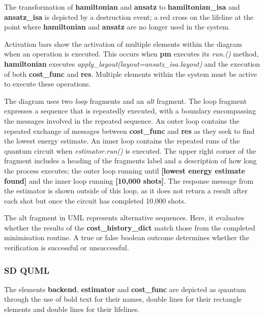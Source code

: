 \documentclass{article}
\begin{document}
The transformation of \textbf{hamiltonian} and \textbf{ansatz} to \textbf{hamiltonian\_isa} and \textbf{ansatz\_isa} is depicted by a destruction event; a red cross on the lifeline at the point where \textbf{hamiltonian} and \textbf{ansatz} are no longer used in the system.

Activation bars show the activation of multiple elements within the diagram when an operation is executed\cite{creatley}. This occurs when \textbf{pm} executes its \textit{run.()} method, \textbf{hamiltonian} executes \textit{apply\_layout(layout=ansatz\_isa.layout)} and the execution of both \textbf{cost\_func} and \textbf{res}. Multiple elements within the system must be active to execute these operations.

The diagram uses two \textit{loop} fragments and an \textit{alt} fragment. The loop fragment expresses a sequence that is repeatedly executed, with a boundary encompassing the messages involved in the repeated sequence\cite{Seidl_Scholz_Huemer_Kappel_Duffy_2014}. An outer loop contains the repeated exchange of messages between \textbf{cost\_func} and \textbf{res} as they seek to find the lowest energy estimate. An inner loop contains the repeated runs of the quantum circuit when \textit{estimator.run()} is executed. The upper right corner of the fragment includes a heading of the fragments label and a description of how long the process executes; the outer loop running until \textbf{[lowest energy estimate found]} and the inner loop running \textbf{[10,000 shots]}. The response message from the estimator is shown outside of this loop, as it does not return a result after each shot but once the circuit has completed 10,000 shots. 

The alt fragment in UML represents alternative sequences\cite{Seidl_Scholz_Huemer_Kappel_Duffy_2014}. Here, it evaluates whether the results of the \textbf{cost\_history\_dict} match those from the completed minimisation routine. A true or false boolean outcome determines whether the verification is successful or unsuccessful.

\subsubsection{SD QUML}

The elements \textbf{backend}, \textbf{estimator} and \textbf{cost\_func} are depicted as quantum through the use of bold text for their names, double lines for their rectangle elements and double lines for their lifelines. 
\end{document}
